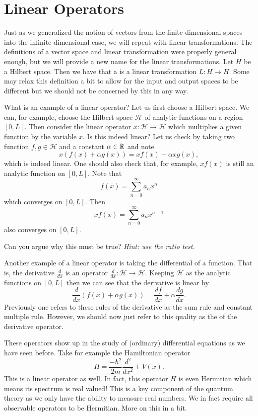 \section{Linear Operators}

Just as we generalized the notion of vectors from the finite dimensional spaces into the infinite dimensional case, we will repeat with linear transformations.  The definitions of a vector space and linear transformation were properly general enough, but we will provide a new name for the linear transformations. Let $H$ be a Hilbert space. Then we have that a  is a linear transformation $L \colon H \to H$.  Some may relax this definition a bit to allow for the input and output spaces to be different but we should not be concerned by this in any way.

What is an example of a linear operator? Let us first choose a Hilbert space. We can, for example, choose the Hilbert space $\mathcal{H}$ of analytic functions on a region $[0,L]$. Then consider the linear operator $x\colon \mathcal{H} \to \mathcal{H}$ which multiplies a given function by the variable $x$. Is this indeed linear?  Let us check by taking two function $f,g\in \mathcal{H}$ and a constant $\alpha \in \mathbb{R}$ and note
\[
x(f(x)+\alpha g(x)) = xf(x)+\alpha xg(x),
\]  
which is indeed linear.  One should also check that, for example, $xf(x)$ is still an analytic function on $[0,L]$. Note that
\[
f(x) = \sum_{n=0}^\infty a_n x^n
\]
which converges on $[0,L]$. Then 
\[
xf(x) = \sum_{n=0}^\infty a_n x^{n+1}
\]
also converges on $[0,L]$.

\begin{exercise}
	Can you argue why this must be true? \emph{Hint: use the ratio test.}
\end{exercise}

Another example of a linear operator is taking the differential of a function. That is, the derivative $\frac{d}{dx}$ is an operator $\frac{d}{dx} \colon \mathcal{H} \to \mathcal{H}$.  Keeping $\mathcal{H}$ as the analytic functions on $[0,L]$ then we can see that the derivative is linear by
\[
	\frac{d}{dx} (f(x)+\alpha g(x)) = \frac{df}{dx} +\alpha \frac{dg}{dx}.
\]
Previously one refers to these rules of the derivative as the sum rule and constant multiple rule. However, we should now just refer to this quality as the  of the derivative operator.  

These operators show up in the study of (ordinary) differential equations as we have seen before. Take for example the Hamiltonian operator
\[
H = \frac{-\hbar^2}{2m} \frac{d^2}{dx^2} + V(x).
\]
This is a linear operator as well.  In fact, this operator $H$ is even Hermitian which means its spectrum is real valued! This is a key component of the quantum theory as we only have the ability to measure real numbers.  We in fact require all observable operators to be Hermitian.  More on this in a bit.


